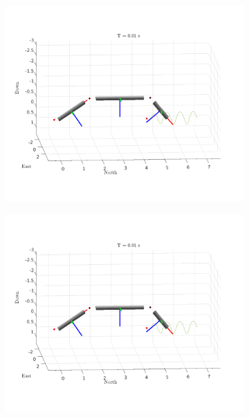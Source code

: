 \begin{figure}[h!]
    \centering
    \begin{subfigure}[b]{0.45\linewidth}
        \includegraphics[page=1,width=\linewidth]{assets/results/dynamic/gif.pdf}
    \end{subfigure}
    \begin{subfigure}[b]{0.45\linewidth}
        \includegraphics[page=2,width=\linewidth]{assets/results/dynamic/gif.pdf}
    \end{subfigure}
    \begin{subfigure}[b]{0.45\linewidth}

\end{subfigure}
\end{figure}
